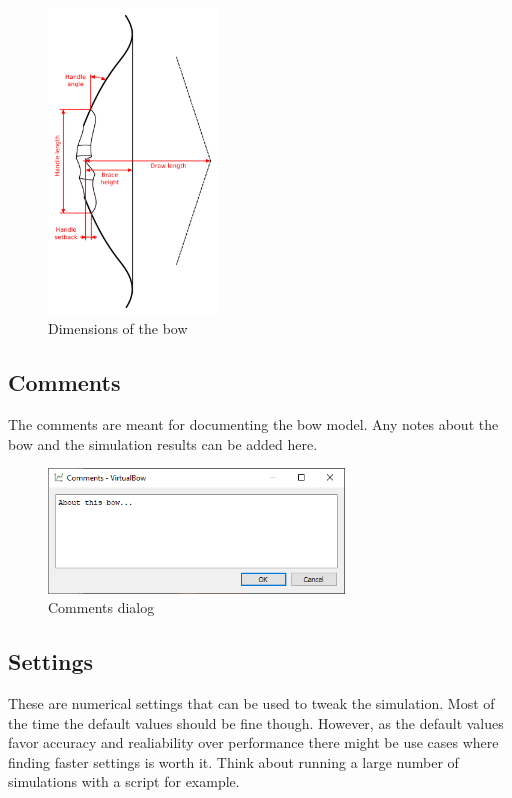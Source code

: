 \documentclass[12pt]{article}
\begin{document}
\begin{figure}[H]
\centering
\includegraphics[width=0.4\textwidth]{figures/dimensions}
\caption{Dimensions of the bow}
\label{fig:dimensions-2}
\end{figure}

\newpage
\subsection{Comments}

The comments are meant for documenting the bow model. Any notes about the bow and the simulation results can be added here.

\begin{figure}[H]
\centering
\includegraphics[width=0.7\textwidth]{figures/screenshots/input/comments}
\caption{Comments dialog}
\label{fig:comments}
\end{figure}

\subsection{Settings}

These are numerical settings that can be used to tweak the simulation.
Most of the time the default values should be fine though.
However, as the default values favor accuracy and realiability over performance there might be use cases where finding faster settings is worth it.
Think about running a large number of simulations with a script for example.
\end{document}

